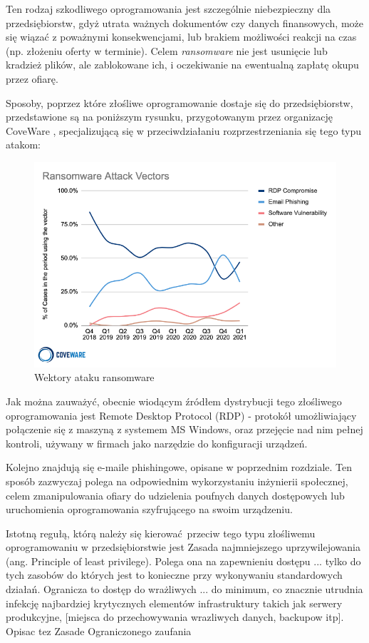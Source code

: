 \documentclass[12pt,twoside]{article}
\begin{document}
Ten rodzaj szkodliwego oprogramowania jest szczególnie niebezpieczny dla przedsiębiorstw, gdyż utrata ważnych dokumentów czy danych finansowych, może się wiązać z poważnymi konsekwencjami, lub brakiem możliwości reakcji na czas (np. złożeniu oferty w terminie). Celem \emph{ransomware} nie jest usunięcie lub kradzież plików, ale zablokowane ich, i oczekiwanie na ewentualną zapłatę okupu przez ofiarę. 

Sposoby, poprzez które złośliwe oprogramowanie dostaje się do przedsiębiorstw, przedstawione są na poniższym rysunku, przygotowanym przez organizację CoveWare \cite{RansomwareAttackVectors}, specjalizującą się w przeciwdziałaniu rozprzestrzeniania się tego typu atakom:
\begin{figure}[ht]
	\centering
	\includegraphics[width=13cm]{figures/ransomware-attack-vectors.png}
	\caption{Wektory ataku ransomware}
	\label{Fig:Wektory ataku ransomware}
\end{figure} 

Jak można zauważyć, obecnie wiodącym źródłem dystrybucji tego złośliwego oprogramowania jest Remote Desktop Protocol (RDP) \cite{RDP} - protokół umożliwiający połączenie się z maszyną z systemem MS Windows, oraz przejęcie nad nim pełnej kontroli, używany w firmach jako narzędzie do konfiguracji urządzeń. 

Kolejno znajdują się e-maile phishingowe, opisane w poprzednim rozdziale. Ten sposób zazwyczaj polega na odpowiednim wykorzystaniu inżynierii społecznej, celem zmanipulowania ofiary do udzielenia poufnych danych dostępowych lub uruchomienia oprogramowania szyfrującego na swoim urządzeniu.  

Istotną regułą, którą należy się kierować przeciw tego typu złośliwemu oprogramowaniu w przedsiębiorstwie jest Zasada najmniejszego uprzywilejowania (ang. Principle of least privilege). Polega ona na zapewnieniu dostępu ... tylko do tych zasobów do których jest to konieczne przy wykonywaniu standardowych działań. Ogranicza to dostęp do wrażliwych ... do minimum, co znacznie utrudnia infekcję najbardziej krytycznych elementów infrastruktury takich jak serwery produkcyjne, [miejsca do przechowywania wrazliwych danych, backupow itp]. Opisac tez Zasade Ograniczonego zaufania
\end{document}
